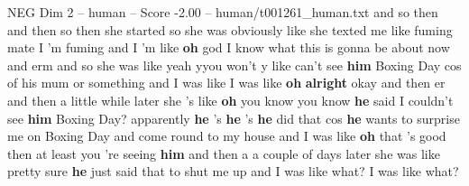 \begin{textsample}{NEG Dim 2 – human – Score -2.00 – human/t001261\_human.txt}  \label{ex:f2_neg_015}
and so then and then so then she started so she was obviously like she texted me like fuming mate I 'm fuming and I 'm like \textbf{oh} god I know what this is gonna be about now and erm and so she was like yeah yyou won't y like can't see \textbf{him} Boxing Day cos of his mum or something and I was like I was like \textbf{oh} \textbf{alright} okay and then er and then a little while later she 's like \textbf{oh} you know you know \textbf{he} said I couldn't see \textbf{him} Boxing Day? apparently \textbf{he} 's \textbf{he} 's \textbf{he} did that cos \textbf{he} wants to surprise me on Boxing Day and come round to my house and I was like \textbf{oh} that 's good then at least you 're seeing \textbf{him} and then a a couple of days later she was like pretty sure \textbf{he} just said that to shut me up and I was like what?
I was like what?

\end{textsample}
